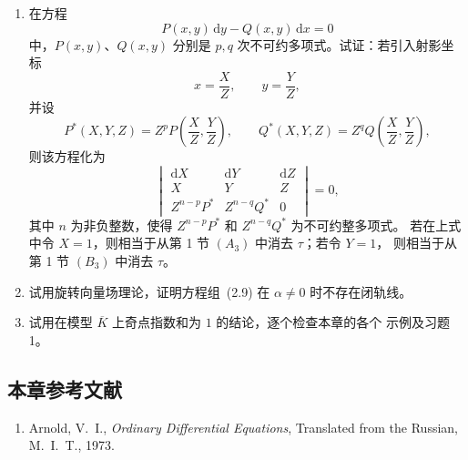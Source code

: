 \begin{enumerate}
  \item 在方程
  \[
    P(x,y)\,\mathrm{d}y-Q(x,y)\,\mathrm{d}x=0
  \]
  中，$P(x,y)$、$Q(x,y)$ 分别是 $p,q$ 次不可约多项式。试证：若引入射影坐标
  \[
    x=\dfrac{X}{Z},\qquad y=\dfrac{Y}{Z},
  \]
  并设
  \[
    P^*(X,Y,Z)=Z^pP\left(\dfrac{X}{Z},\dfrac{Y}{Z}\right),\qquad
    Q^*(X,Y,Z)=Z^qQ\left(\dfrac{X}{Z},\dfrac{Y}{Z}\right),
  \]
  则该方程化为
  \[
    \begin{vmatrix}
      \mathrm{d}X & \mathrm{d}Y & \mathrm{d}Z\\
      X & Y & Z\\
      Z^{n-p}P^* & Z^{n-q}Q^* & 0
    \end{vmatrix}=0,
  \]
  其中 $n$ 为非负整数，使得 $Z^{n-p}P^*$ 和 $Z^{n-q}Q^*$ 为不可约整多项式。
  若在上式中令 $X=1$，则相当于从第 1 节 $(A_3)$ 中消去 $\tau$；若令 $Y=1$，
  则相当于从第 1 节 $(B_3)$ 中消去 $\tau$。

  \item 试用旋转向量场理论，证明方程组~(2.9) 在 $\alpha\ne0$ 时不存在闭轨线。

  \item 试用在模型 $\overline K$ 上奇点指数和为 $1$ 的结论，逐个检查本章的各个
  示例及习题 1。
\end{enumerate}

\subsection*{本章参考文献}
\begin{enumerate}
  \item Arnold, V.~I., \textit{Ordinary Differential Equations}, Translated from the Russian,
  M.~I.~T., 1973.
\end{enumerate}

\endinput
